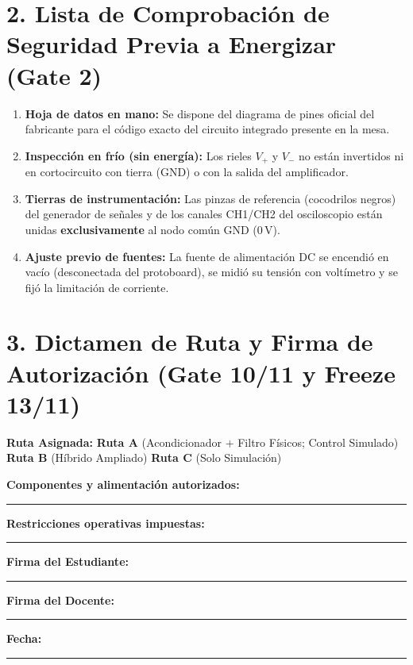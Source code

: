 \documentclass[11pt, a4paper]{article}
\begin{document}
\section*{2. Lista de Comprobación de Seguridad Previa a Energizar (Gate 2)}
\begin{enumerate}
    \item [ \quad ] \textbf{Hoja de datos en mano:} Se dispone del diagrama de pines oficial del fabricante para el código exacto del circuito integrado presente en la mesa.
    \item [ \quad ] \textbf{Inspección en frío (sin energía):} Los rieles $V_+$ y $V_-$ no están invertidos ni en cortocircuito con tierra ($\text{GND}$) o con la salida del amplificador.
    \item [ \quad ] \textbf{Tierras de instrumentación:} Las pinzas de referencia (cocodrilos negros) del generador de señales y de los canales CH1/CH2 del osciloscopio están unidas \textbf{exclusivamente} al nodo común $\text{GND}$ ($0\,\text{V}$).
    \item [ \quad ] \textbf{Ajuste previo de fuentes:} La fuente de alimentación DC se encendió en vacío (desconectada del protoboard), se midió su tensión con voltímetro y se fijó la limitación de corriente.
\end{enumerate}

\section*{3. Dictamen de Ruta y Firma de Autorización (Gate 10/11 y Freeze 13/11)}
\textbf{Ruta Asignada:} \quad [ \quad ] \textbf{Ruta A} (Acondicionador + Filtro Físicos; Control Simulado) \quad [ \quad ] \textbf{Ruta B} (Híbrido Ampliado) \quad [ \quad ] \textbf{Ruta C} (Solo Simulación)

\par\vspace{0.3cm}
\begin{tcolorbox}[colback=white, colframe=ucbblue, title=\textbf{Registro de Autorización Docente}]
    \textbf{Componentes y alimentación autorizados:} \rule{9.5cm}{0.4pt}
    \par\vspace{0.4cm}
    \textbf{Restricciones operativas impuestas:} \rule{10.5cm}{0.4pt}
    \par\vspace{0.8cm}
    \textbf{Firma del Estudiante:} \rule{4.5cm}{0.4pt} \hfill \textbf{Firma del Docente:} \rule{4.5cm}{0.4pt} \hfill \textbf{Fecha:} \rule{2.5cm}{0.4pt}
\end{tcolorbox}
\end{document}
